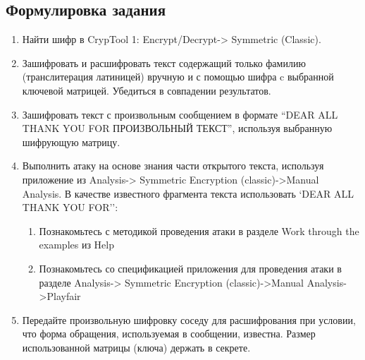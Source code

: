 \documentclass[a4paper, 14pt]{extarticle}
\begin{document}
\subsection{Формулировка задания}
\begin{enumerate}
    \item Найти шифр в CrypTool 1: Encrypt/Decrypt-> Symmetric (Classic).
    \item Зашифровать и расшифровать текст содержащий только фамилию (транслитерация латиницей) вручную и с помощью шифра c выбранной ключевой матрицей. Убедиться в совпадении результатов.
    \item Зашифровать текст с произвольным сообщением в формате ``DEAR ALL THANK YOU FOR ПРОИЗВОЛЬНЫЙ ТЕКСТ'', используя выбранную шифрующую матрицу.
    \item Выполнить атаку на основе знания части открытого текста, используя приложение из Analysis-> Symmetric Encryption (classic)->Manual Analysis. В качестве известного фрагмента текста использовать `DEAR ALL THANK YOU FOR'':
    \begin{enumerate}  
        \item Познакомьтесь с методикой проведения атаки в разделе Work through the examples из Help
        \item Познакомьтесь со спецификацией приложения для проведения атаки в разделе Analysis-> Symmetric Encryption (classic)->Manual Analysis->Playfair
    \end{enumerate}
    \item Передайте произвольную шифровку соседу для расшифрования
при условии, что форма обращения, используемая в сообщении, известна.
Размер использованной матрицы (ключа) держать в секрете.
\end{enumerate}
\end{document}
